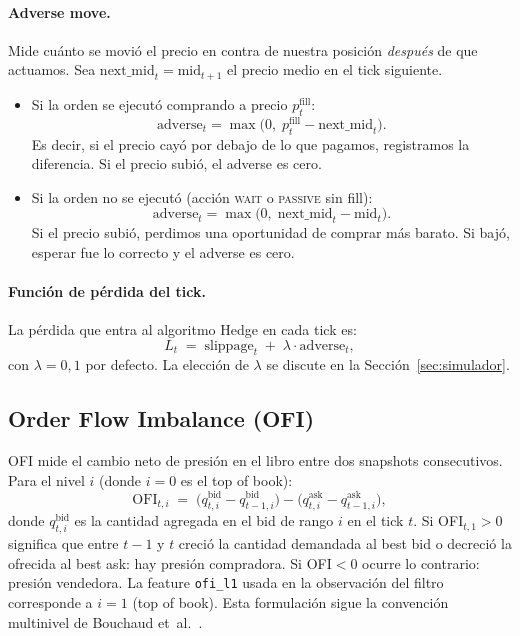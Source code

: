 \documentclass[journal,onecolumn,11pt]{IEEEtran}
\begin{document}
\paragraph{Adverse move.}
Mide cuánto se movió el precio en contra de nuestra posición
\emph{después} de que actuamos. Sea
$\text{next\_mid}_t = \text{mid}_{t+1}$ el precio medio en el tick
siguiente.

\begin{itemize}
\item Si la orden se ejecutó comprando a precio $p^{\text{fill}}_t$:
\begin{equation}
\text{adverse}_t = \max\bigl(0,\; p^{\text{fill}}_t - \text{next\_mid}_t\bigr).
\label{eq:adverse-fill}
\end{equation}
Es decir, si el precio cayó por debajo de lo que pagamos, registramos
la diferencia. Si el precio subió, el adverse es cero.

\item Si la orden no se ejecutó (acción \textsc{wait} o \textsc{passive}
sin fill):
\begin{equation}
\text{adverse}_t = \max\bigl(0,\; \text{next\_mid}_t - \text{mid}_t\bigr).
\label{eq:adverse-nofill}
\end{equation}
Si el precio subió, perdimos una oportunidad de comprar más barato.
Si bajó, esperar fue lo correcto y el adverse es cero.
\end{itemize}

\paragraph{Función de pérdida del tick.}
La pérdida que entra al algoritmo Hedge en cada tick es:
\begin{equation}
L_t \;=\; \text{slippage}_t \;+\; \lambda \cdot \text{adverse}_t,
\label{eq:loss}
\end{equation}
con $\lambda = 0{,}1$ por defecto. La elección de
$\lambda$ se discute en la Sección~\ref{sec:simulador}.

\subsection{Order Flow Imbalance (OFI)}\label{ssec:ofi}

OFI mide el cambio neto de presión en el libro entre dos snapshots
consecutivos. Para el nivel $i$ (donde $i\!=\!0$ es el top of book):
\begin{equation}
\mathrm{OFI}_{t,i} \;=\; \bigl(q^{\text{bid}}_{t,i} - q^{\text{bid}}_{t-1,i}\bigr)
                       - \bigl(q^{\text{ask}}_{t,i} - q^{\text{ask}}_{t-1,i}\bigr),
\label{eq:ofi}
\end{equation}
donde $q^{\text{bid}}_{t,i}$ es la cantidad agregada en el bid de
rango $i$ en el tick $t$. Si OFI$_{t,1}>0$ significa que entre
$t\!-\!1$ y $t$ creció la cantidad demandada al best bid o decreció
la ofrecida al best ask: hay presión compradora. Si OFI$<0$ ocurre
lo contrario: presión vendedora. La feature \texttt{ofi\_l1} usada en
la observación del filtro corresponde a $i\!=\!1$ (top of book). Esta
formulación sigue la convención multinivel de Bouchaud et~al.~\cite{bouchaud2018trades}.
\end{document}
